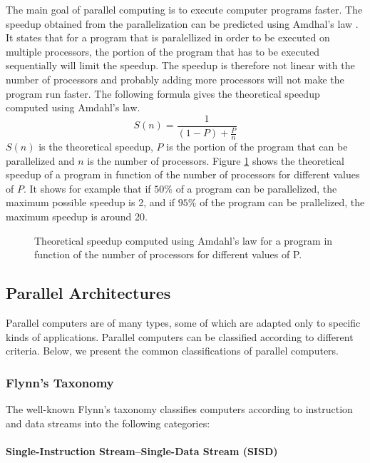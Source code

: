 The main goal of parallel computing is to execute computer programs faster. The speedup obtained from the parallelization can be predicted using Amdhal's law \cite{amdahl:1967}. It states that for a program that is paralellized in order to be executed on multiple processors, the portion of the program that has to be executed sequentially will limit the speedup. The speedup is therefore not linear with the number of processors and probably adding more processors will not make the program run faster. The following formula gives the theoretical speedup computed using Amdahl's law.
\begin{equation}
S(n) = \frac{1}{(1-P) + \frac{P}{n}}
\end{equation}
$S(n)$ is the theoretical speedup, $P$ is the portion of the program that can be parallelized and $n$ is the number of processors. Figure \ref{fig:amdhal} shows the theoretical speedup of a program in function of the number of processors for different values of $P$. It shows for example that if $50\%$ of a program can be parallelized, the maximum possible speedup is 2, and if $95\%$ of the program can be prallelized, the maximum speedup is around 20.

\begin{figure}[phbt]
\centering
\captionsetup{justification=centering}

\caption{Theoretical speedup computed using Amdahl’s law for a program in function of the number of processors for different values of P.}
\label{fig:amdhal}
\end{figure} 

\subsection{Parallel Architectures}

Parallel computers are of many types, some of which are adapted only to specific kinds of applications. Parallel computers can be classified according to different criteria. Below, we present the common classifications of parallel computers. 

\subsubsection{Flynn's Taxonomy}

The well-known Flynn's taxonomy \cite{flynn:1972} classifies computers according to instruction and data streams into the following categories:

\paragraph{Single-Instruction Stream--Single-Data Stream (SISD)}

